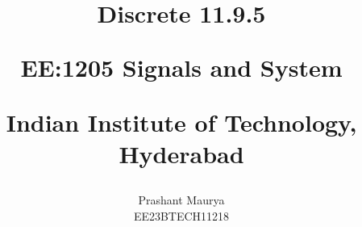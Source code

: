\documentclass[journal,12pt,twocolumn]{IEEEtran}
\theoremstyle{remark}
\begin{document}
%




\vspace{3cm}

\title{
Discrete 11.9.5

\large{EE:1205 Signals and System}

Indian Institute of Technology, Hyderabad
}
\author{Prashant Maurya

EE23BTECH11218
}	


%
%
%

% 
%



% 
\end{document}
